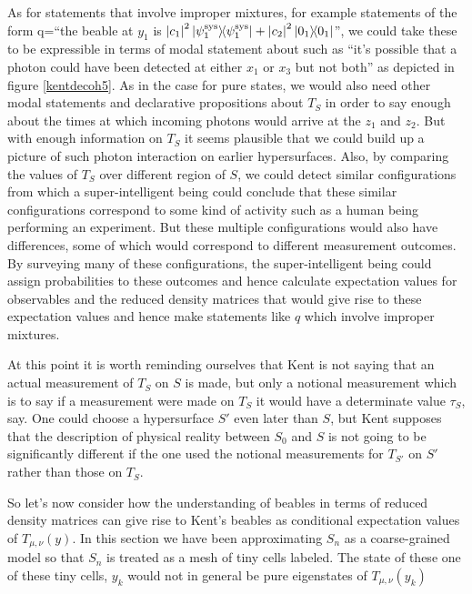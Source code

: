 As for statements that involve improper mixtures, for example statements of the form q=``the beable at $y_1$ is $\abs{c_1}^2\dyad{\psi_1^\text{sys}}+\abs{c_2}^2\dyad{0_1}$'', we could take these to be expressible in terms of modal statement about such as ``it's possible that a photon could have been detected at either $x_1$ or $x_3$ but not both'' as depicted in figure \ref{kentdecoh5}. As in the case for pure states, we would also need other modal statements and declarative propositions about $T_S$ in order to say enough about the times at which incoming photons would arrive at the $z_1$ and $z_2$. But with enough information on $T_S$ it seems plausible that we could build up a picture of such photon interaction on earlier hypersurfaces. Also, by comparing the values of $T_S$ over different region of $S$, we could detect similar configurations from which a super-intelligent being could conclude that these similar configurations correspond to some kind of activity such as a human being performing an experiment.   But these multiple configurations would also have differences, some of which would correspond to different measurement outcomes. By surveying many of these configurations, the super-intelligent being could assign probabilities to these outcomes and hence calculate expectation values for observables and the reduced density matrices that would give rise to these expectation values and hence make statements like $q$ which involve improper mixtures. 

At this point it is worth reminding ourselves that Kent is not saying that an actual measurement of $T_S$ on $S$ is made, but only a notional measurement which is to say if a measurement were made on $T_S$ it would have a determinate value $\tau_S$, say. One could choose a hypersurface $S'$ even later than $S$, but Kent supposes that the description of physical reality between $S_0$ and $S$ is not going to be significantly different if the one used the notional measurements for $T_{S'}$ on $S'$ rather than those on $T_S$.

So let's now consider how the understanding of beables in terms of reduced density matrices can give rise to Kent's beables as conditional expectation values of $T_{\mu,\nu}(y)$. In this section we have been approximating $S_n$ as a coarse-grained model so that $S_n$ is treated as a mesh of tiny cells labeled. The state of these one of these tiny cells, $y_k$ would not in general be pure eigenstates of $T_{\mu,\nu}(y_k)$


\nocite{Shimony93}
\nocite{Bell}